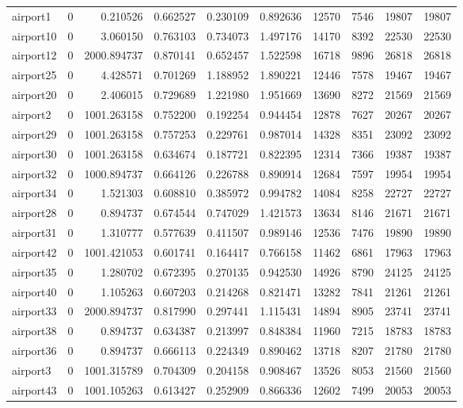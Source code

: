 \begin{longtable}{|l|r|r|r|r|r|r|r|r|r|}
airport1 & 0 & 0.210526 & 0.662527 & 0.230109 & 0.892636 & 12570 & 7546 & 19807 & 19807 \\
airport10 & 0 & 3.060150 & 0.763103 & 0.734073 & 1.497176 & 14170 & 8392 & 22530 & 22530 \\
airport12 & 0 & 2000.894737 & 0.870141 & 0.652457 & 1.522598 & 16718 & 9896 & 26818 & 26818 \\
airport25 & 0 & 4.428571 & 0.701269 & 1.188952 & 1.890221 & 12446 & 7578 & 19467 & 19467 \\
airport20 & 0 & 2.406015 & 0.729689 & 1.221980 & 1.951669 & 13690 & 8272 & 21569 & 21569 \\
airport2 & 0 & 1001.263158 & 0.752200 & 0.192254 & 0.944454 & 12878 & 7627 & 20267 & 20267 \\
airport29 & 0 & 1001.263158 & 0.757253 & 0.229761 & 0.987014 & 14328 & 8351 & 23092 & 23092 \\
airport30 & 0 & 1001.263158 & 0.634674 & 0.187721 & 0.822395 & 12314 & 7366 & 19387 & 19387 \\
airport32 & 0 & 1000.894737 & 0.664126 & 0.226788 & 0.890914 & 12684 & 7597 & 19954 & 19954 \\
airport34 & 0 & 1.521303 & 0.608810 & 0.385972 & 0.994782 & 14084 & 8258 & 22727 & 22727 \\
airport28 & 0 & 0.894737 & 0.674544 & 0.747029 & 1.421573 & 13634 & 8146 & 21671 & 21671 \\
airport31 & 0 & 1.310777 & 0.577639 & 0.411507 & 0.989146 & 12536 & 7476 & 19890 & 19890 \\
airport42 & 0 & 1001.421053 & 0.601741 & 0.164417 & 0.766158 & 11462 & 6861 & 17963 & 17963 \\
airport35 & 0 & 1.280702 & 0.672395 & 0.270135 & 0.942530 & 14926 & 8790 & 24125 & 24125 \\
airport40 & 0 & 1.105263 & 0.607203 & 0.214268 & 0.821471 & 13282 & 7841 & 21261 & 21261 \\
airport33 & 0 & 2000.894737 & 0.817990 & 0.297441 & 1.115431 & 14894 & 8905 & 23741 & 23741 \\
airport38 & 0 & 0.894737 & 0.634387 & 0.213997 & 0.848384 & 11960 & 7215 & 18783 & 18783 \\
airport36 & 0 & 0.894737 & 0.666113 & 0.224349 & 0.890462 & 13718 & 8207 & 21780 & 21780 \\
airport3 & 0 & 1001.315789 & 0.704309 & 0.204158 & 0.908467 & 13526 & 8053 & 21560 & 21560 \\
airport43 & 0 & 1001.105263 & 0.613427 & 0.252909 & 0.866336 & 12602 & 7499 & 20053 & 20053 \\

\end{longtable}
